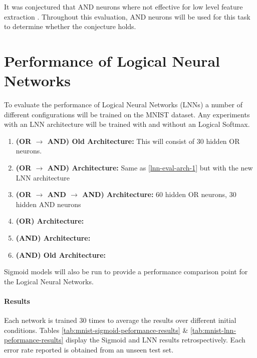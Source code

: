 It was conjectured that AND neurons where not effective for low level feature extraction \cite{LearningLogicalActivations}. Throughout this evaluation, AND neurons will be used for this task to determine whether the conjecture holds.


\section{Performance of Logical Neural Networks} \label{sec:lnn-eval-peformance}
To evaluate the performance of Logical Neural Networks (LNNs) a number of different configurations will be trained on the MNIST dataset. Any experiments with an LNN architecture will be trained with and without an Logical Softmax.

\begin{enumerate}
	\item \textbf{(OR $\rightarrow$ AND) Old Architecture:} This will consist of 30 hidden OR neurons. \label{lnn-eval-arch-1}
	\item \textbf{(OR $\rightarrow$ AND) Architecture:} Same as \ref{lnn-eval-arch-1} but with the new LNN architecture \label{lnn-eval-arch-2}
	\item \textbf{(OR $\rightarrow$ AND $\rightarrow$ AND) Architecture: } 60 hidden OR neurons, 30 hidden AND neurons\label{lnn-eval-arch-4}
	\item \textbf{(OR) Architecture:} \label{lnn-eval-arch-5}
	\item \textbf{(AND) Architecture:} \label{lnn-eval-arch-6}
	\item \textbf{(AND) Old Architecture:} \label{lnn-eval-arch-7}
\end{enumerate}

Sigmoid models will also be run to provide a performance comparison point for the Logical Neural Networks.

\paragraph{Results}
Each network is trained 30 times to average the results over different initial conditions. Tables \ref{tab:mnist-sigmoid-peformance-results} \& \ref{tab:mnist-lnn-peformance-results} display the Sigmoid and LNN results retrospectively. Each error rate reported is obtained from an unseen test set.

